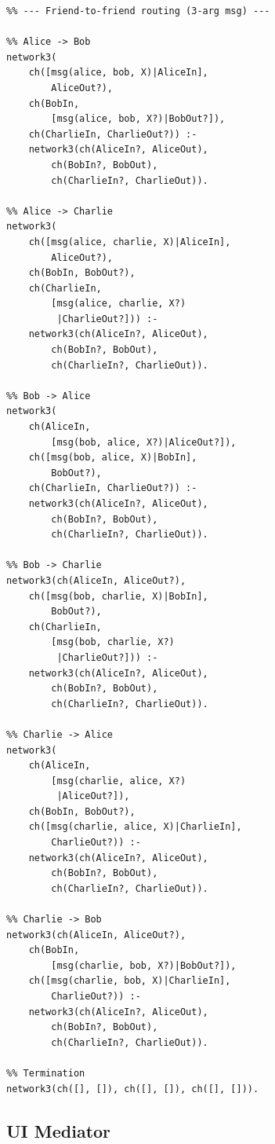 \begin{verbatim}
%% --- Friend-to-friend routing (3-arg msg) ---

%% Alice -> Bob
network3(
    ch([msg(alice, bob, X)|AliceIn],
        AliceOut?),
    ch(BobIn,
        [msg(alice, bob, X?)|BobOut?]),
    ch(CharlieIn, CharlieOut?)) :-
    network3(ch(AliceIn?, AliceOut),
        ch(BobIn?, BobOut),
        ch(CharlieIn?, CharlieOut)).

%% Alice -> Charlie
network3(
    ch([msg(alice, charlie, X)|AliceIn],
        AliceOut?),
    ch(BobIn, BobOut?),
    ch(CharlieIn,
        [msg(alice, charlie, X?)
         |CharlieOut?])) :-
    network3(ch(AliceIn?, AliceOut),
        ch(BobIn?, BobOut),
        ch(CharlieIn?, CharlieOut)).

%% Bob -> Alice
network3(
    ch(AliceIn,
        [msg(bob, alice, X?)|AliceOut?]),
    ch([msg(bob, alice, X)|BobIn],
        BobOut?),
    ch(CharlieIn, CharlieOut?)) :-
    network3(ch(AliceIn?, AliceOut),
        ch(BobIn?, BobOut),
        ch(CharlieIn?, CharlieOut)).

%% Bob -> Charlie
network3(ch(AliceIn, AliceOut?),
    ch([msg(bob, charlie, X)|BobIn],
        BobOut?),
    ch(CharlieIn,
        [msg(bob, charlie, X?)
         |CharlieOut?])) :-
    network3(ch(AliceIn?, AliceOut),
        ch(BobIn?, BobOut),
        ch(CharlieIn?, CharlieOut)).

%% Charlie -> Alice
network3(
    ch(AliceIn,
        [msg(charlie, alice, X?)
         |AliceOut?]),
    ch(BobIn, BobOut?),
    ch([msg(charlie, alice, X)|CharlieIn],
        CharlieOut?)) :-
    network3(ch(AliceIn?, AliceOut),
        ch(BobIn?, BobOut),
        ch(CharlieIn?, CharlieOut)).

%% Charlie -> Bob
network3(ch(AliceIn, AliceOut?),
    ch(BobIn,
        [msg(charlie, bob, X?)|BobOut?]),
    ch([msg(charlie, bob, X)|CharlieIn],
        CharlieOut?)) :-
    network3(ch(AliceIn?, AliceOut),
        ch(BobIn?, BobOut),
        ch(CharlieIn?, CharlieOut)).

%% Termination
network3(ch([], []), ch([], []), ch([], [])).
\end{verbatim}

\subsection{UI Mediator}
\label{app:ui-mediator}

